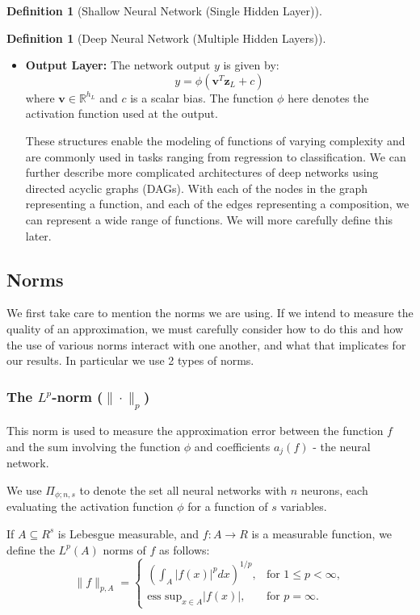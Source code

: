 \documentclass[11pt,a4paper]{article}
\theoremstyle{plain}
\theoremstyle{definition}
\newtheorem{definition}[theorem]{Definition}
\theoremstyle{remark}
\begin{document}
\begin{definition}[Shallow Neural Network (Single Hidden Layer)]
\begin{definition}[Deep Neural Network (Multiple Hidden Layers)]
\begin{itemize}
    \item \textbf{Output Layer:} The network output \(y\) is given by:
  \[
  y = \phi(\mathbf{v}^T \mathbf{z}_L + c)
  \]
  where \(\mathbf{v} \in \mathbb{R}^{h_L}\) and \(c\) is a scalar bias. The function \(\phi\) here denotes the activation function used at the output.

These structures enable the modeling of functions of varying complexity and are commonly used in tasks ranging from regression to classification.
We can further describe more complicated architectures of deep networks using directed acyclic graphs (DAGs). With each of the nodes in the graph representing a function, and each of the edges representing a composition, we can represent a wide range of functions. We will more carefully define this later.

\end{itemize}

\subsection{Norms}
We first take care to mention the norms we are using. If we intend to measure the quality of an approximation, we must carefully consider how to do this and how the use of various norms interact with one another, and what that implicates for our results. In particular we use 2 types of norms.

\subsubsection{The \( L^p \)-norm (\( \|\cdot\|_p \))}

This norm is used to measure the approximation error between the function \( f \) and the sum involving the function \( \phi \) and coefficients \( a_j(f) \) - the neural network.

We use \(\Pi_{\phi ; n,s}\) to denote the set all neural networks with \(n\) neurons, each evaluating the activation function \(\phi \) for a function of \(s\) variables.

If \( A \subseteq R^{s}\) is Lebesgue measurable, and \(f : A \to R\) is a measurable function, we define the \(L^{p} (A)\) norms of \(f\) as follows:   
   \[
   \|f\|_{p,A} = 
   \begin{cases} 
   \left( \int_{A} |f(x)|^p dx \right)^{1/p}, & \text{for } 1 \leq p < \infty, \\
   \text{ess sup}_{x \in A} |f(x)|, & \text{for } p = \infty.
   \end{cases}
   \]



\end{definition}
\end{definition}
\end{document}
